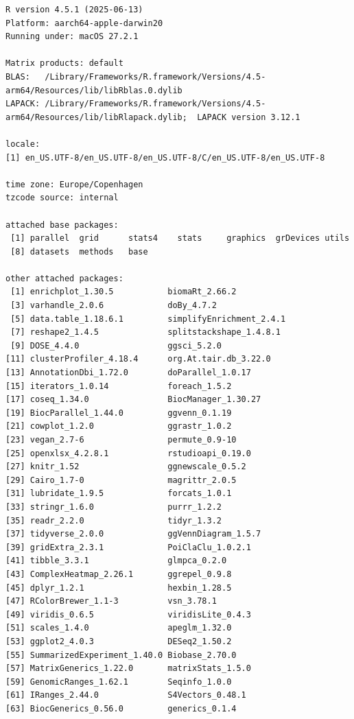 \documentclass[
  11pt,
]{article}
\begin{document}
\begin{verbatim}
R version 4.5.1 (2025-06-13)
Platform: aarch64-apple-darwin20
Running under: macOS 27.2.1

Matrix products: default
BLAS:   /Library/Frameworks/R.framework/Versions/4.5-arm64/Resources/lib/libRblas.0.dylib 
LAPACK: /Library/Frameworks/R.framework/Versions/4.5-arm64/Resources/lib/libRlapack.dylib;  LAPACK version 3.12.1

locale:
[1] en_US.UTF-8/en_US.UTF-8/en_US.UTF-8/C/en_US.UTF-8/en_US.UTF-8

time zone: Europe/Copenhagen
tzcode source: internal

attached base packages:
 [1] parallel  grid      stats4    stats     graphics  grDevices utils    
 [8] datasets  methods   base     

other attached packages:
 [1] enrichplot_1.30.5           biomaRt_2.66.2             
 [3] varhandle_2.0.6             doBy_4.7.2                 
 [5] data.table_1.18.6.1         simplifyEnrichment_2.4.1   
 [7] reshape2_1.4.5              splitstackshape_1.4.8.1    
 [9] DOSE_4.4.0                  ggsci_5.2.0                
[11] clusterProfiler_4.18.4      org.At.tair.db_3.22.0      
[13] AnnotationDbi_1.72.0        doParallel_1.0.17          
[15] iterators_1.0.14            foreach_1.5.2              
[17] coseq_1.34.0                BiocManager_1.30.27        
[19] BiocParallel_1.44.0         ggvenn_0.1.19              
[21] cowplot_1.2.0               ggrastr_1.0.2              
[23] vegan_2.7-6                 permute_0.9-10             
[25] openxlsx_4.2.8.1            rstudioapi_0.19.0          
[27] knitr_1.52                  ggnewscale_0.5.2           
[29] Cairo_1.7-0                 magrittr_2.0.5             
[31] lubridate_1.9.5             forcats_1.0.1              
[33] stringr_1.6.0               purrr_1.2.2                
[35] readr_2.2.0                 tidyr_1.3.2                
[37] tidyverse_2.0.0             ggVennDiagram_1.5.7        
[39] gridExtra_2.3.1             PoiClaClu_1.0.2.1          
[41] tibble_3.3.1                glmpca_0.2.0               
[43] ComplexHeatmap_2.26.1       ggrepel_0.9.8              
[45] dplyr_1.2.1                 hexbin_1.28.5              
[47] RColorBrewer_1.1-3          vsn_3.78.1                 
[49] viridis_0.6.5               viridisLite_0.4.3          
[51] scales_1.4.0                apeglm_1.32.0              
[53] ggplot2_4.0.3               DESeq2_1.50.2              
[55] SummarizedExperiment_1.40.0 Biobase_2.70.0             
[57] MatrixGenerics_1.22.0       matrixStats_1.5.0          
[59] GenomicRanges_1.62.1        Seqinfo_1.0.0              
[61] IRanges_2.44.0              S4Vectors_0.48.1           
[63] BiocGenerics_0.56.0         generics_0.1.4             


\end{verbatim}
\end{document}
